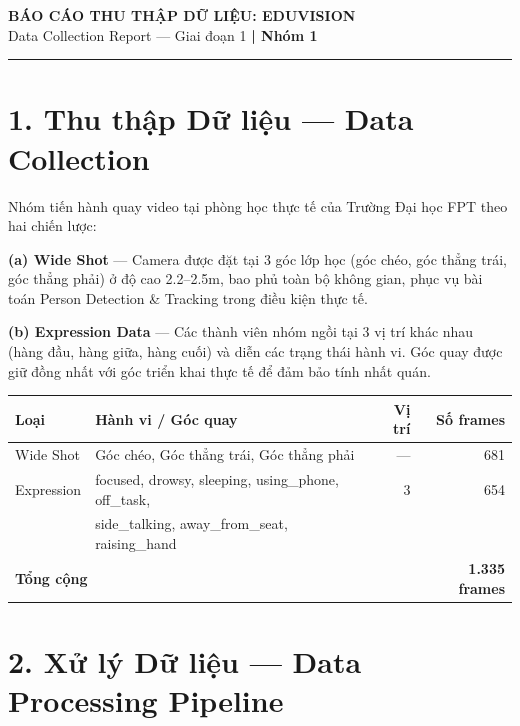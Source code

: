\documentclass[a4paper,10pt]{article}
\begin{document}
\begin{center}
  {\LARGE\bfseries BÁO CÁO THU THẬP DỮ LIỆU: EDUVISION}\\[0.15cm]
  {\large Data Collection Report --- Giai đoạn 1 \quad\textbf{| Nhóm 1}}
\end{center}
\vspace{-0.2cm}
\noindent\rule{\textwidth}{0.4pt}
\vspace{0.1cm}

\section*{1. Thu thập Dữ liệu --- Data Collection}

Nhóm tiến hành quay video tại phòng học thực tế của Trường Đại học FPT theo hai chiến lược:

\textbf{(a) Wide Shot} --- Camera được đặt tại 3 góc lớp học (góc chéo, góc thẳng trái, góc thẳng phải) ở độ cao 2.2--2.5m, bao phủ toàn bộ không gian, phục vụ bài toán Person Detection \& Tracking trong điều kiện thực tế.

\textbf{(b) Expression Data} --- Các thành viên nhóm ngồi tại 3 vị trí khác nhau (hàng đầu, hàng giữa, hàng cuối) và diễn các trạng thái hành vi. Góc quay được giữ đồng nhất với góc triển khai thực tế để đảm bảo tính nhất quán.

\vspace{0.1cm}
\begin{center}
\begin{tabularx}{0.96\textwidth}{lXrr}
\toprule
\textbf{Loại} & \textbf{Hành vi / Góc quay} & \textbf{Vị trí} & \textbf{Số frames} \\
\midrule
Wide Shot & Góc chéo, Góc thẳng trái, Góc thẳng phải & --- & 681 \\
Expression & focused, drowsy, sleeping, using\_phone, off\_task, & 3 & 654 \\
           & side\_talking, away\_from\_seat, raising\_hand & & \\
\midrule
\multicolumn{3}{l}{\textbf{Tổng cộng}} & \textbf{1.335 frames} \\
\bottomrule
\end{tabularx}
\end{center}

\section*{2. Xử lý Dữ liệu --- Data Processing Pipeline}
\end{document}
